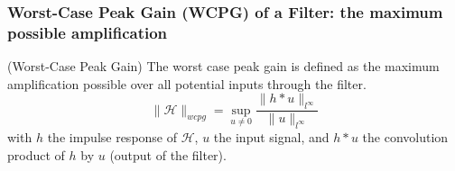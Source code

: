 	\subsubsection{Worst-Case Peak Gain (WCPG) of a Filter: the maximum possible amplification}
	\begin{thdef} (Worst-Case Peak Gain)
		The worst case peak gain is defined as the maximum amplification
		possible over all potential inputs through the filter.
		$$\|\mathcal{H}\|_{wcpg}=\sup_{u\neq0}\frac{\|h*u\|_{l^{\infty}}}{\|u\|_{l^{\infty}}}$$
		with $h$ the impulse response of $\mathcal{H}$, $u$ the input signal, and $h * u$ the convolution product of $h$ by $u$ (output of the
				filter).
	
	\end{thdef}
%
%
%

